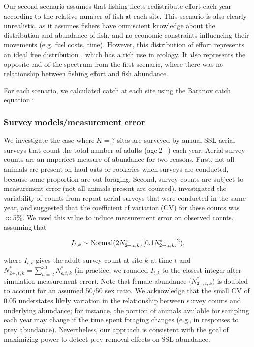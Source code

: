\documentclass[nonumbib,leqno]{nrc1}
\begin{document}
Our second scenario assumes that fishing fleets redistribute effort each year according to the relative number of fish at each site.  This scenario is also clearly unrealistic, as it assumes fishers have omniscient knowledge about the distribution and abundance of fish, and no economic constraints influencing their movements (e.g. fuel costs, time).  However, this distribution of effort represents an ideal free distribution \citep{FretwellLucas1970}, which has a rich use in ecology.  It also represents the opposite end of the spectrum from the first scenario, where there was no relationship between fishing effort and fish abundance.

For each scenario, we calculated catch at each site using the Baranov catch equation \citep{Baranov1918}:


\subsubsection{Survey models/measurement error}

We investigate the case where $K=?$ sites are surveyed by annual SSL aerial surveys that count the total
number of adults (age 2+) each year.  Aerial survey counts are an imperfect measure of abundance for two reasons.  First, not all animals are present on haul-outs or rookeries when surveys are conducted, because some proportion are out foraging.  Second, survey counts are subject to measurement error (not all animals present are counted).  \citet{HolmesEtAl2007} investigated the variability of counts from repeat aerial surveys that were conducted in the same year, and suggested that the coefficient of variation (CV) for these counts was $\approx 5\%$.  We used this value to induce measurement error on observed counts, assuming that 
\begin{linenomath}
  \begin{equation}
     I_{t,k} \sim {\rm Normal}(2N_{2+,t,k}^*,[0.1 N_{2+,t,k}^*]^2),
  \end{equation}
\end{linenomath}
where $I_{t,k}$ gives the adult survey count at site $k$ at time $t$ and $N_{2+,t,k}^*=\sum_{a=2}^30 N_{a,t,k}^*$ (in practice, we rounded $I_{t,k}$ to the closest integer after simulation measurement error).  Note that female abundance ($N_{2+,t,k}^*$) is doubled to account for an assumed 50/50 sex ratio.  We acknowledge that the small CV of 0.05 understates likely variation in the relationship between survey counts and underlying abundance; for instance, the portion of animals available for sampling each year may change if the time spent foraging changes (e.g., in responses to prey abundance).  Nevertheless, our approach is consistent with the goal of maximizing power to detect prey removal effects on SSL abundance.
\end{document}
